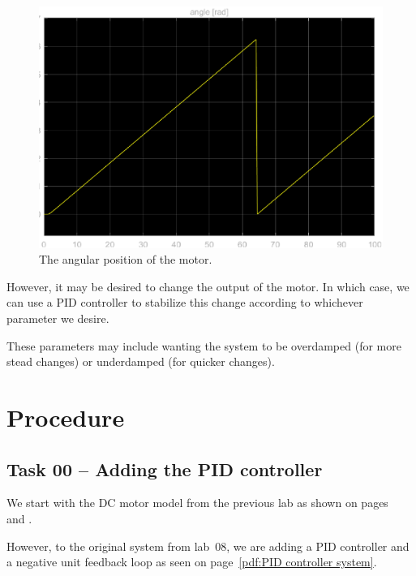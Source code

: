 \documentclass[12pt]{article}
\begin{document}
\begin{figure}
    \centering
    \includegraphics[width=\linewidth]{img/task05_angular_position.eps}
    \caption{The angular position of the motor.}
    \label{fig:angular position of motor}
\end{figure}

However, it may be desired to change the output of the motor. In which case, we can use a PID controller to stabilize this change according to whichever parameter we desire.

These parameters may include wanting the system to be overdamped (for more stead changes) or underdamped (for quicker changes).

\section{Procedure}\label{sec:procedure}

\subsection{Task 00 -- Adding the PID controller}\label{ssc:dc motor model}

We start with the DC motor model from the previous lab as shown on pages~\pageref{pdf:dc motor model} and \pageref{pdf:integrators}.

However, to the original system from lab~08, we are adding a PID controller and a negative unit feedback loop as seen on page~\ref{pdf:PID controller system}.
\end{document}
